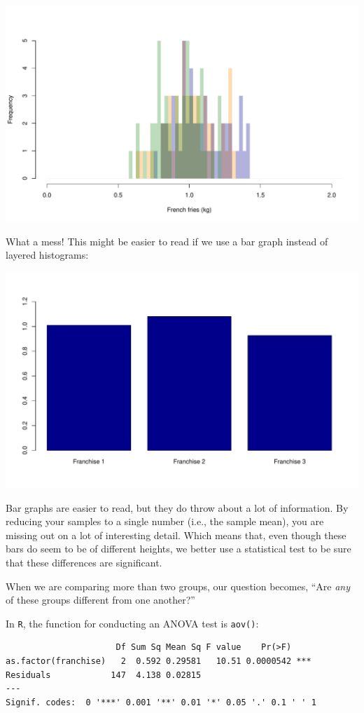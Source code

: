 \documentclass[
]{book}
\begin{document}
\includegraphics{figures/unnamed-chunk-184-1.pdf}

What a mess! This might be easier to read if we use a bar graph instead of layered histograms:

\includegraphics{figures/unnamed-chunk-185-1.pdf}

Bar graphs are easier to read, but they do throw about a lot of information. By reducing your samples to a single number (i.e., the sample mean), you are missing out on a lot of interesting detail. Which means that, even though these bars do seem to be of different heights, we better use a statistical test to be sure that these differences are significant.

When we are comparing more than two groups, our question becomes, ``Are \emph{any} of these groups different from one another?''

In \texttt{R}, the function for conducting an ANOVA test is \texttt{aov()}:

\begin{verbatim}
                      Df Sum Sq Mean Sq F value    Pr(>F)    
as.factor(franchise)   2  0.592 0.29581   10.51 0.0000542 ***
Residuals            147  4.138 0.02815                      
---
Signif. codes:  0 '***' 0.001 '**' 0.01 '*' 0.05 '.' 0.1 ' ' 1
\end{verbatim}
\end{document}
